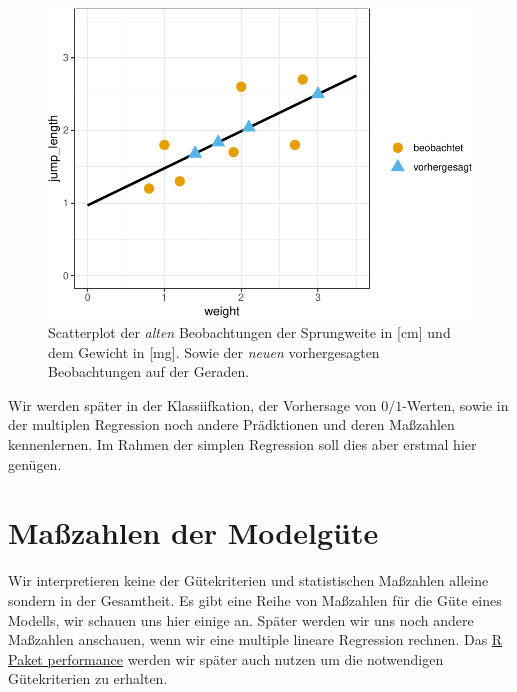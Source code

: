 \documentclass[
  letterpaper,
]{scrbook}
\begin{document}
\begin{figure}

{\centering \includegraphics{./stat-linear-reg-basic_files/figure-pdf/fig-scatter-lin-pred-1.pdf}

}

\caption{\label{fig-scatter-lin-pred}Scatterplot der \emph{alten}
Beobachtungen der Sprungweite in {[}cm{]} und dem Gewicht in {[}mg{]}.
Sowie der \emph{neuen} vorhergesagten Beobachtungen auf der Geraden.}

\end{figure}

Wir werden später in der Klassiifkation, der Vorhersage von
\(0/1\)-Werten, sowie in der multiplen Regression noch andere
Prädktionen und deren Maßzahlen kennenlernen. Im Rahmen der simplen
Regression soll dies aber erstmal hier genügen.

\hypertarget{sec-lin-reg-quality}{%
\chapter{Maßzahlen der Modelgüte}\label{sec-lin-reg-quality}}

{}

Wir interpretieren keine der Gütekriterien und statistischen Maßzahlen
alleine sondern in der Gesamtheit. Es gibt eine Reihe von Maßzahlen für
die Güte eines Modells, wir schauen uns hier einige an. Später werden
wir uns noch andere Maßzahlen anschauen, wenn wir eine multiple lineare
Regression rechnen. Das
\href{https://easystats.github.io/performance/}{R Paket performance}
werden wir später auch nutzen um die notwendigen Gütekriterien zu
erhalten.
\end{document}

